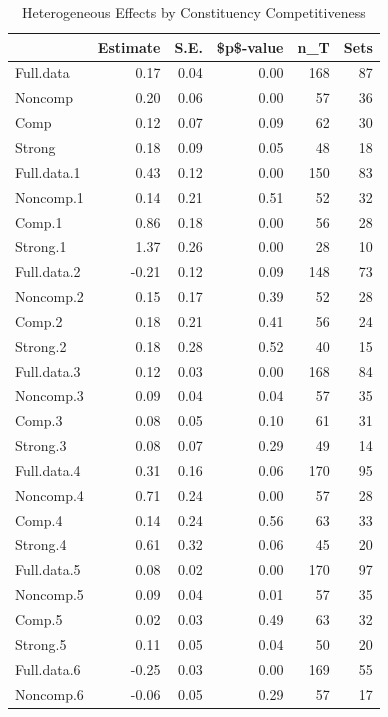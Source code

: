 \begin{table}[ht]
\centering
\caption{Heterogeneous Effects by Constituency Competitiveness} 
\label{tab:results.HETCOMP}
\begin{tabular}{lrrrrr}
  \hline
 & Estimate & S.E. & \$p\$-value & n\_T & Sets \\ 
  \hline
Full.data & 0.17 & 0.04 & 0.00 & 168 & 87 \\ 
  Noncomp & 0.20 & 0.06 & 0.00 & 57 & 36 \\ 
  Comp & 0.12 & 0.07 & 0.09 & 62 & 30 \\ 
  Strong & 0.18 & 0.09 & 0.05 & 48 & 18 \\ 
  Full.data.1 & 0.43 & 0.12 & 0.00 & 150 & 83 \\ 
  Noncomp.1 & 0.14 & 0.21 & 0.51 & 52 & 32 \\ 
  Comp.1 & 0.86 & 0.18 & 0.00 & 56 & 28 \\ 
  Strong.1 & 1.37 & 0.26 & 0.00 & 28 & 10 \\ 
  Full.data.2 & -0.21 & 0.12 & 0.09 & 148 & 73 \\ 
  Noncomp.2 & 0.15 & 0.17 & 0.39 & 52 & 28 \\ 
  Comp.2 & 0.18 & 0.21 & 0.41 & 56 & 24 \\ 
  Strong.2 & 0.18 & 0.28 & 0.52 & 40 & 15 \\ 
  Full.data.3 & 0.12 & 0.03 & 0.00 & 168 & 84 \\ 
  Noncomp.3 & 0.09 & 0.04 & 0.04 & 57 & 35 \\ 
  Comp.3 & 0.08 & 0.05 & 0.10 & 61 & 31 \\ 
  Strong.3 & 0.08 & 0.07 & 0.29 & 49 & 14 \\ 
  Full.data.4 & 0.31 & 0.16 & 0.06 & 170 & 95 \\ 
  Noncomp.4 & 0.71 & 0.24 & 0.00 & 57 & 28 \\ 
  Comp.4 & 0.14 & 0.24 & 0.56 & 63 & 33 \\ 
  Strong.4 & 0.61 & 0.32 & 0.06 & 45 & 20 \\ 
  Full.data.5 & 0.08 & 0.02 & 0.00 & 170 & 97 \\ 
  Noncomp.5 & 0.09 & 0.04 & 0.01 & 57 & 35 \\ 
  Comp.5 & 0.02 & 0.03 & 0.49 & 63 & 32 \\ 
  Strong.5 & 0.11 & 0.05 & 0.04 & 50 & 20 \\ 
  Full.data.6 & -0.25 & 0.03 & 0.00 & 169 & 55 \\ 
  Noncomp.6 & -0.06 & 0.05 & 0.29 & 57 & 17 \\ 

\end{tabular}
\end{table}
